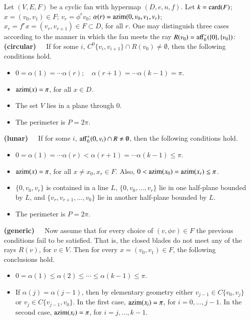 \begin{lemma}[monotonicity]  Let $(V,E,F)$ be a cyclic fan with hypermap $(D,e,n,f)$.  Let $k={\operatorname{card}}(F)$; $x=(v_0,v_1)\in F$;  $v_r = \phi^r v_0$; $\alpha(r) = {\operatorname{azim}}(0,v_0,v_1,v_r)$;  $x_r = f^r x = (v_r,v_{r+1})\in F\subset D$, for all $r$.  
One may distinguish three cases according to the manner in which the fan meets the ray $R(v_0) = {\operatorname{aff}}_0^-(\{0\},\{v_0\})$:
{\bf (circular)~~} If for some $i$, $C^0\{v_i,v_{i+1}\}\cap R(v_0)\ne \emptyset$, then the following conditions hold.
\begin{itemize}
\item $0=\alpha(1)=\cdots \alpha(r);\quad \alpha(r+1)=\cdots\alpha(k-1)=\pi$.
\item ${\operatorname{azim}}(x)=\pi$, for all $x\in D$.
\item The set $V$ lies in a plane through $0$.
\item The perimeter is $P=2\pi$.
\end{itemize}
{\bf (lunar)~~} If for some $i$, ${\operatorname{aff}}_0^+(0,v_i) \cap R\ne\emptyset$, then the following conditions hold.
\begin{itemize}
\item $0=\alpha(1)=\cdots \alpha(r) < \alpha(r+1)=\cdots\alpha(k-1)\le\pi$.
\item ${\operatorname{azim}}(x)=\pi$, for all $x\ne x_0,x_r\in F$.  Also, $0<{\operatorname{azim}}(x_0)={\operatorname{azim}}(x_r)\le \pi$.
\item $\{0,v_0,v_r\}$ is contained in a line $L$, $\{0,v_0,\ldots,v_r\}$ lie in one half-plane bounded by $L$, and $\{v_r,v_{r+1},\ldots,v_0\}$ lie in another half-plane bounded by $L$.
\item The perimeter is $P=2\pi$.
\end{itemize}

{\bf (generic)~~} Now assume that for every choice of $(v,\phi v)\in F$ the previous conditions fail to be satisfied.  That is, the closed blades do not meet any of the rays $R(v)$, for $v\in V$.  Then for every $x=(v_0,v_1)\in F$, the following conclusions hold.
\begin{itemize}
\item $0=\alpha(1)\le \alpha(2)\le \cdots\le \alpha(k-1)\le\pi$.
\item If $\alpha(j)=\alpha(j-1)$, then by elementary geometry either $v_{j-1}\in C\{v_0,v_j\}$ or $v_j\in C\{v_{j-1},v_0\}$.  In the first case,
${\operatorname{azim}}(x_i)=\pi$, for $i=0,\ldots,j-1$.  In the second case,
${\operatorname{azim}}(x_i)=\pi$, for $i=j,\ldots,k-1$.
\end{itemize}
\end{lemma}

